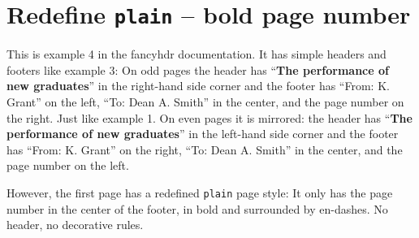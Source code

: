 \documentclass[twoside]{article}
\begin{document}
\section*{Redefine \texttt{plain} -- bold page number}
\label{sec:twosided}
\thispagestyle{plain}

\begin{boxedminipage}{\textwidth}
This is example 4 in the fancyhdr documentation. It has simple headers and footers like example 3:
On odd pages the header has {``\textbf{The performance of new graduates}''} in the right-hand side corner and the footer has ``From: K. Grant'' on the left, ``To: Dean A. Smith'' in the center, and the page number on the right. Just like example 1. On even pages it is mirrored:  the header has {``\textbf{The performance of new graduates}''} in the left-hand side corner and the footer has ``From: K. Grant'' on the right, ``To: Dean A. Smith'' in the center, and the page number on the left.

However, the first page has a redefined \texttt{plain} page style: It only has the page number in the center of the footer, in bold and surrounded by en-dashes. No header, no decorative rules.
\end{boxedminipage}

\bigskip

\lipsum
\end{document}
